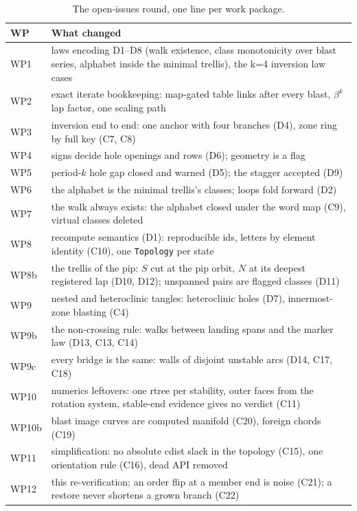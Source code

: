 \documentclass[11pt,a4paper]{article}
\newcommand{\code}[1]{\texttt{#1}}
\begin{document}
\begin{table}[htbp]
\centering\footnotesize
\caption{The open-issues round, one line per work package.}
\label{tab:wps}
\begin{tabularx}{\textwidth}{lY}
\toprule
WP & What changed \\
\midrule
WP1 & laws encoding D1--D8 (walk existence, class monotonicity over blast series, alphabet inside the minimal trellis), the k=4 inversion law cases \\
WP2 & exact iterate bookkeeping: map-gated table links after every blast, $\beta^k$ lap factor, one scaling path \\
WP3 & inversion end to end: one anchor with four branches (D4), zone ring by full key (C7, C8) \\
WP4 & signs decide hole openings and rows (D6); geometry is a flag \\
WP5 & period-$k$ hole gap closed and warned (D5); the stagger accepted (D9) \\
WP6 & the alphabet is the minimal trellis's classes; loops fold forward (D2) \\
WP7 & the walk always exists: the alphabet closed under the word map (C9), virtual classes deleted \\
WP8 & recompute semantics (D1): reproducible ids, letters by element identity (C10), one \code{Topology} per state \\
WP8b & the trellis of the pip: $S$ cut at the pip orbit, $N$ at its deepest registered lap (D10, D12); unspanned pairs are flagged classes (D11) \\
WP9 & nested and heteroclinic tangles: heteroclinic holes (D7), innermost-zone blasting (C4) \\
WP9b & the non-crossing rule: walks between landing spans and the marker law (D13, C13, C14) \\
WP9c & every bridge is the same: walls of disjoint unstable arcs (D14, C17, C18) \\
WP10 & numerics leftovers: one rtree per stability, outer faces from the rotation system, stable-end evidence gives no verdict (C11) \\
WP10b & blast image curves are computed manifold (C20), foreign chords (C19) \\
WP11 & simplification: no absolute cdist slack in the topology (C15), one orientation rule (C16), dead API removed \\
WP12 & this re-verification; an order flip at a member end is noise (C21); a restore never shortens a grown branch (C22) \\
\bottomrule
\end{tabularx}
\end{table}
\end{document}
